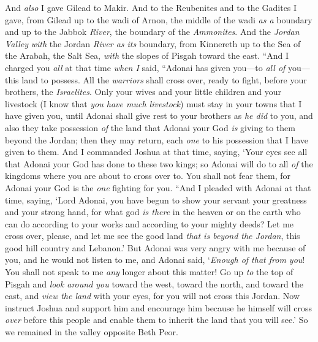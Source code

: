 \begin{biblechapter}
\verse And \textit{also} I gave Gilead to Makir.
\verse And to the Reubenites and to the Gadites I gave, from Gilead up to the wadi of Arnon, the middle of the wadi \textit{as a} boundary and up to the Jabbok \textit{River}, the boundary of the \textit{Ammonites}.
\verse And the \textit{Jordan Valley} \textit{with} the Jordan \textit{River as its} boundary, from Kinnereth up to the Sea of the Arabah, the Salt Sea, \textit{with} the slopes of Pisgah toward the east.
\verse “And I charged you \textit{all} at that time \textit{when I} said, “Adonai has given you—to \textit{all of} you—this land to possess. All the \textit{warriors} shall cross over, ready to fight, before your brothers, the \textit{Israelites}.
\verse Only your wives and your little children and your livestock (I know that \textit{you have much livestock}) must stay in your towns that I have given you,
\verse until Adonai shall give rest to your brothers as \textit{he did} to you, and also they take possession \textit{of} the land that Adonai your God \textit{is} giving to them beyond the Jordan; then they may return, each \textit{one} to his possession that I have given to them.
\verse And I commanded Joshua at that time, saying, ‘Your eyes see all that Adonai your God has done to these two kings; so Adonai will do to all \textit{of} the kingdoms where you are about to cross over to.
\verse You shall not fear them, for Adonai your God is the \textit{one} fighting for you.
\verse “And I pleaded with Adonai at that time, saying,
\verse ‘Lord Adonai, you have begun to show your servant your greatness and your strong hand, for what god \textit{is there} in the heaven or on the earth who can do according to your works and according to your mighty deeds?
\verse Let me cross over, please, and let me see the good land \textit{that is beyond the Jordan}, this good hill country and Lebanon.’
\verse But Adonai was very angry with me because of you, and he would not listen to me, and Adonai said, ‘\textit{Enough of that from you}! You shall not speak to me \textit{any} longer about this matter!
\verse Go up \textit{to} the top of Pisgah and \textit{look around you} toward the west, toward the north, and toward the east, and \textit{view} \textit{the land} with your eyes, for you will not cross this Jordan.
\verse Now instruct Joshua and support him and encourage him because he himself will cross \textit{over} before this people and enable them to inherit the land that you will see.’
\verse So we remained in the valley opposite Beth Peor.
\end{biblechapter}

